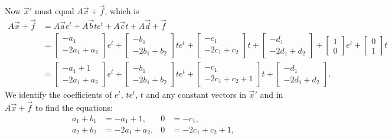 \begin{example}
\begin{equation*}
\end{equation*}
Now ${\vec{x}}'$ must equal $A\vec{x} + \vec{f}$, which is
\begin{equation*}
\begin{split}
A \vec{x} + \vec{f} &=
A \vec{a}
e^{t}
+
A \vec{b}
t e^{t}
+
A \vec{c}
t
+
A \vec{d}
+ \vec{f}
\\
& =
\begin{bmatrix}
-a_1 \\ -2a_1+a_2
\end{bmatrix}
e^{t}
+
\begin{bmatrix}
-b_1 \\ -2b_1+b_2
\end{bmatrix}
t e^{t}
+
\begin{bmatrix}
-c_1 \\ -2c_1+c_2
\end{bmatrix}
t
+
\begin{bmatrix}
-d_1 \\ -2d_1+d_2
\end{bmatrix}
+
\begin{bmatrix}
1 \\ 0
\end{bmatrix} 
e^t
+
\begin{bmatrix}
0 \\ 1
\end{bmatrix} 
t 
\\
&=
\begin{bmatrix}
-a_1+1 \\ -2a_1+a_2
\end{bmatrix}
e^{t}
+
\begin{bmatrix}
-b_1 \\ -2b_1+b_2
\end{bmatrix}
t e^{t}
+
\begin{bmatrix}
-c_1 \\ -2c_1+c_2+1
\end{bmatrix}
t
+
\begin{bmatrix}
-d_1 \\ -2d_1+d_2
\end{bmatrix} .
\end{split}
\end{equation*}
We identify the coefficients of $e^t$, $te^t$, $t$ and any constant
vectors in $\vec{x}'$ and in $A\vec{x}+\vec{f}$ to find the equations:
\begin{align*}
a_1+b_1 & = -a_1+1 , &
0 & = -c_1 , \\
a_2+b_2 & = -2a_1+a_2 , &
0 & = -2c_1+c_2 + 1 , \\

\end{align*}
\end{example}
